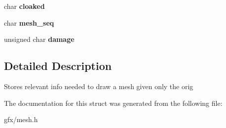 \begin{DoxyCompactItemize}
\item 
char {\bfseries cloaked}\hypertarget{structMeshDrawContext_a4acc77c295fab2b50f14fd9a2397e81b}{}\label{structMeshDrawContext_a4acc77c295fab2b50f14fd9a2397e81b}

\item 
char {\bfseries mesh\+\_\+seq}\hypertarget{structMeshDrawContext_ae0093a7f17ff0b2c4b49a2e33d0e01cb}{}\label{structMeshDrawContext_ae0093a7f17ff0b2c4b49a2e33d0e01cb}

\item 
unsigned char {\bfseries damage}\hypertarget{structMeshDrawContext_a08472e729743ccc68fc099ce7b8ab634}{}\label{structMeshDrawContext_a08472e729743ccc68fc099ce7b8ab634}

\end{DoxyCompactItemize}


\subsection{Detailed Description}
Stores relevant info needed to draw a mesh given only the orig 

The documentation for this struct was generated from the following file\+:\begin{DoxyCompactItemize}
\item 
gfx/mesh.\+h\end{DoxyCompactItemize}
